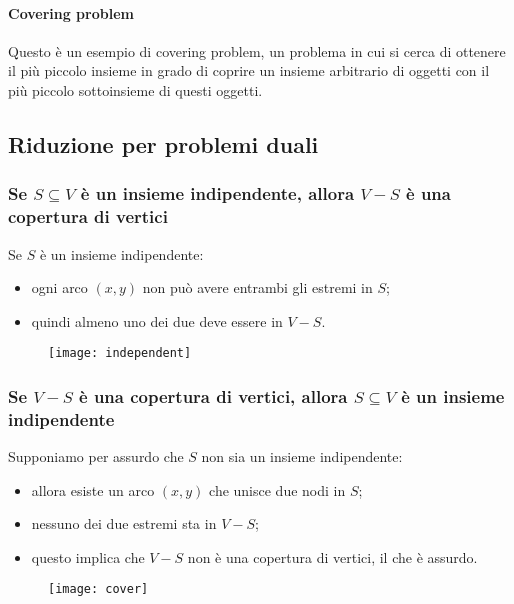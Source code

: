 \paragraph{Covering problem}
Questo è un esempio di covering problem, un problema in cui si cerca di ottenere il più piccolo insieme in grado di coprire un insieme arbitrario di oggetti con il più piccolo sottoinsieme di questi oggetti.

\subsection{Riduzione per problemi duali}

\subsubsection{Se \(S \subseteq V\) è un insieme indipendente, allora \(V - S\) è una copertura di vertici}

Se \(S\) è un insieme indipendente:
\begin{itemize}
    \item ogni arco \((x,y)\) non può avere entrambi gli estremi in \(S\);
    \item quindi almeno uno dei due deve essere in \(V-S\).
\end{itemize}
\begin{figure}[H]\centering
	\texttt{[image: independent]}
\end{figure}

\subsubsection{Se \(V - S\) è una copertura di vertici, allora \(S \subseteq V\) è un insieme indipendente}

Supponiamo per assurdo che \(S\) non sia un insieme indipendente:
\begin{itemize}
    \item allora esiste un arco \((x,y)\) che unisce due nodi in \(S\);
    \item nessuno dei due estremi sta in \(V-S\);
    \item questo implica che \(V-S\) non è una copertura di vertici, il che è assurdo.
\end{itemize}
\begin{figure}[H]\centering
	\texttt{[image: cover]}
\end{figure}

